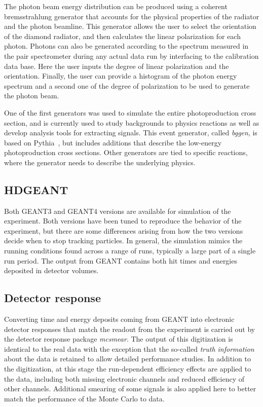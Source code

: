 The photon beam energy distribution can be produced using a coherent bremsstrahlung generator that accounts for the physical properties of the radiator and the photon beamline. This generator allows the user to select the orientation of the diamond radiator, and then calculates the linear polarization for each photon. Photons can also be generated according to the spectrum measured in the pair spectrometer during any actual data run by interfacing to the calibration data base. Here the user inputs the degree of linear polarization and the orientation. Finally, the user can provide a histogram of the photon energy spectrum and a second one of the degree of polarization to be used to generate the photon beam. 

One of the first generators was used to simulate the entire photoproduction cross section, and is currently used to study backgrounds to physics reactions as well as develop analysis tools for extracting signals. This event generator, called {\em bggen}, is based on Pythia~\cite{Sjostrand:2006za}, but includes additions that describe the low-energy photoproduction cross sections. Other generators are tied to specific reactions, where the generator needs to describe the underlying physics.

\subsection{HDGEANT \label{sec:hdgeant}}
Both GEANT3 and GEANT4 versions are available for simulation of the experiment. Both versions have been tuned to reproduce the behavior of the experiment, but there are some differences arising from how the two versions decide when to stop tracking particles. In general, the simulation mimics the running conditions found across a range of runs, typically a large part of a single run period. The output from GEANT contains both hit times and energies deposited in detector volumes. 

\subsection[Detector response]{Detector response}
Converting time and energy deposits coming from GEANT into electronic detector responses that match the readout from the experiment is carried out by the detector response package \textit{mcsmear}. The output of this digitization is identical to the real data with the exception that the so-called \emph{truth information} about the data is retained to allow detailed performance studies. In addition to the digitization, at this stage the run-dependent efficiency effects are applied to the data, including both missing electronic channels and reduced efficiency of other channels. Additional smearing of some signals is also applied here to better match the performance of the Monte Carlo to data. 

